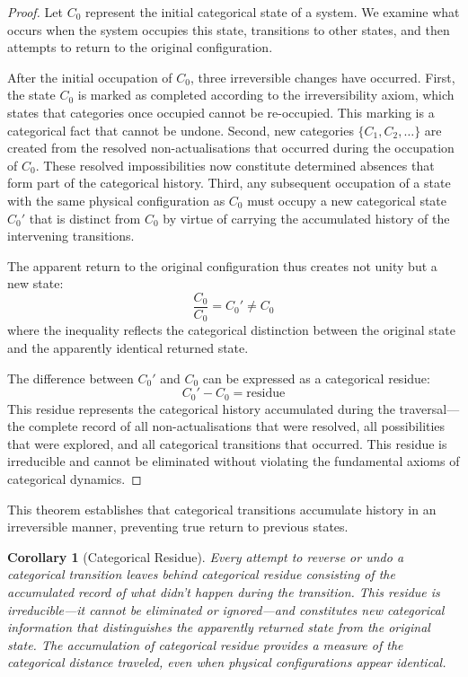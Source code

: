 \documentclass[12pt,a4paper]{article}
\newtheorem{corollary}[theorem]{Corollary}
\theoremstyle{definition}
\theoremstyle{remark}
\begin{document}
\begin{proof}
Let $C_0$ represent the initial categorical state of a system. We examine what occurs when the system occupies this state, transitions to other states, and then attempts to return to the original configuration.

After the initial occupation of $C_0$, three irreversible changes have occurred. First, the state $C_0$ is marked as completed according to the irreversibility axiom, which states that categories once occupied cannot be re-occupied. This marking is a categorical fact that cannot be undone. Second, new categories $\{C_1, C_2, \ldots\}$ are created from the resolved non-actualisations that occurred during the occupation of $C_0$. These resolved impossibilities now constitute determined absences that form part of the categorical history. Third, any subsequent occupation of a state with the same physical configuration as $C_0$ must occupy a new categorical state $C_0'$ that is distinct from $C_0$ by virtue of carrying the accumulated history of the intervening transitions.

The apparent return to the original configuration thus creates not unity but a new state:
\begin{equation}
\frac{C_0}{C_0} = C_0' \neq C_0
\end{equation}
where the inequality reflects the categorical distinction between the original state and the apparently identical returned state.

The difference between $C_0'$ and $C_0$ can be expressed as a categorical residue:
\begin{equation}
C_0' - C_0 = \text{residue}
\end{equation}
This residue represents the categorical history accumulated during the traversal—the complete record of all non-actualisations that were resolved, all possibilities that were explored, and all categorical transitions that occurred. This residue is irreducible and cannot be eliminated without violating the fundamental axioms of categorical dynamics.
\end{proof}

This theorem establishes that categorical transitions accumulate history in an irreversible manner, preventing true return to previous states.

\begin{corollary}[Categorical Residue]
Every attempt to reverse or undo a categorical transition leaves behind categorical residue consisting of the accumulated record of what didn't happen during the transition. This residue is irreducible—it cannot be eliminated or ignored—and constitutes new categorical information that distinguishes the apparently returned state from the original state. The accumulation of categorical residue provides a measure of the categorical distance traveled, even when physical configurations appear identical.
\end{corollary}
\end{document}
